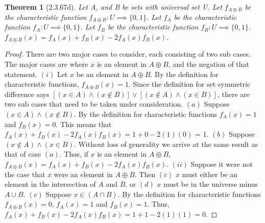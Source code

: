 \documentclass[a4paper, 12pt]{article}
\theoremstyle{plain}
\newtheorem*{theorem*}{Theorem}
\begin{document}
	
	\begin{theorem*}[2.3.67d]
		Let A, and B be sets with universal set U. Let $f_{A \oplus B}$ be the characteristic function $f_{A \oplus B}: U \implies \{0, 1\}$. Let $f_{A}$ be the characteristic function $f_{A}: U \implies \{0, 1\}$. Let $f_{B}$ be the characteristic function \newline $f_{B}: U \implies \{0, 1\}$. $f_{A \oplus B}(x) = f_{A}(x) + f_{B}(x) - 2f_{A}(x)f_{B}(x)$.
	\end{theorem*}
	
	\begin{proof}
		There are two major cases to consider, each consisting of two sub cases. The major cases are where $x$ is an element in $A \oplus B$, and the negation of that statement.
		\newline
		\newline
		$(i)$ Let $x$ be an element in $A \oplus B$. By the definition for \newline characteristic functions, $f_{A \oplus B}(x) = 1$. Since the definition for set symmetric difference says $[(x \in A) \land (x \notin B)] \lor [(x \notin A) \land (x \in B)]$, there are two sub cases that need to be taken under consideration. \newline \newline \indent $(a)$ Suppose $(x \in A) \land (x \notin B)$. By the definition for characteristic \indent functions $f_{A}(x) = 1$ and $f_{B}(x) = 0$. This means that \newline \indent $f_{A}(x) + f_{B}(x) - 2f_{A}(x)f_{B}(x) = 1 + 0 - 2(1)(0)$ = 1. 
		\newline \newline \indent $(b)$ Suppose $(x \notin A) \land (x \in B)$. Without loss of generality we arrive \indent at the same result as that of case $(a)$.
		\newline
		\newline
		Thus, if $x$ is an element in $A \oplus B$, $f_{A \oplus B}(x) = f_{A}(x) + f_{B}(x) - 2f_{A}(x)f_{B}(x)$.
		\newline
		\newline
		$(ii)$ Suppose it were not the case that $x$ were an element in $A \oplus B$. Then $(c)$ $x$ must either be an element in the intersection of $A$ and $B$, or $(d)$ $x$ must be in the universe minus $A \cup B$.
		\newline
		\newline \indent $(c)$ Suppose $x \in (A \cap B)$. By the definition for characteristic \newline \indent functions $f_{A \oplus B}(x) = 0$, $f_{A}(x) = 1$ and $f_{B}(x) = 1$. Thus, \newline \indent $f_{A}(x) + f_{B}(x) - 2f_{A}(x)f_{B}(x) = 1 + 1 - 2(1)(1) = 0$.

\end{proof}
\end{document}
